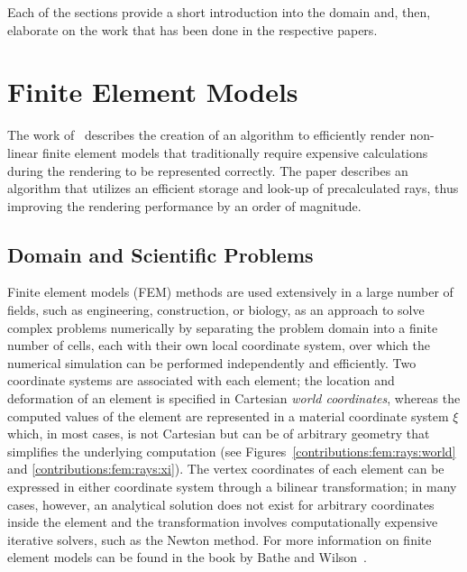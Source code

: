 Each of the sections provide a short introduction into the domain and, then, elaborate on the work that has been done in the respective papers.





\section{Finite Element Models} \label{contributions:fem}
The work of \paperFEM\ describes the creation of an algorithm to efficiently render non-linear finite element models that traditionally require expensive calculations during the rendering to be represented correctly.  The paper describes an algorithm that utilizes an efficient storage and look-up of precalculated rays, thus improving the rendering performance by an order of magnitude.

\subsection{Domain and Scientific Problems} \label{contributions:fem:background}
Finite element models (FEM) methods are used extensively in a large number of fields, such as engineering, construction, or biology, as an approach to solve complex problems numerically by separating the problem domain into a finite number of cells, each with their own local coordinate system, over which the numerical simulation can be performed independently and efficiently.  Two coordinate systems are associated with each element; the location and deformation of an element is specified in Cartesian \emph{world coordinates}, whereas the computed values of the element are represented in a material coordinate system $\xi$ which, in most cases, is not Cartesian but can be of arbitrary geometry that simplifies the underlying computation (see Figures~\ref{contributions:fem:rays:world} and \ref{contributions:fem:rays:xi}).  The vertex coordinates of each element can be expressed in either coordinate system through a bilinear transformation; in many cases, however, an analytical solution does not exist for arbitrary coordinates inside the element and the transformation involves computationally expensive iterative solvers, such as the Newton method.  For more information on finite element models can be found in the book by Bathe and Wilson~\cite{bathe1976numerical}.

